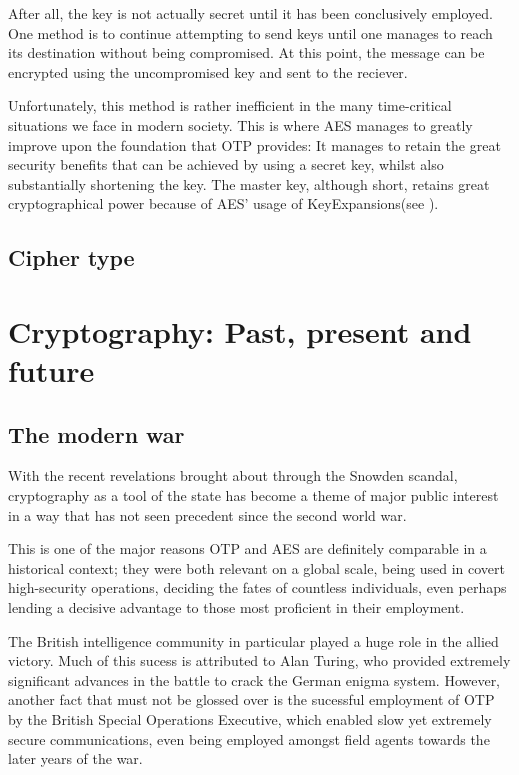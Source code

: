 \documentclass[12pt]{report}
\theoremstyle{definition}
\theoremstyle{remark}
\begin{document}
After all, the key is not actually secret until it has been conclusively employed. One method is to continue attempting to send keys until one manages to reach its destination without being compromised. At this point, the message can be encrypted using the uncompromised key and sent to the reciever.

Unfortunately, this method is rather inefficient in the many time-critical situations we face in modern society. This is where AES manages to greatly improve upon the foundation that OTP provides: It manages to retain the great security benefits that can be achieved by using a secret key, whilst also substantially shortening the key. The master key, although short, retains great cryptographical power because of AES' usage of KeyExpansions(see ).

\subsection{Cipher type}

\section{Cryptography: Past, present and future}

\subsection{The modern war}
With the recent revelations brought about through the Snowden scandal, cryptography as a tool of the state has become a theme of major public interest in a way that has not seen precedent since the second world war.

This is one of the major reasons OTP and AES are definitely comparable in a historical context; they were both relevant on a global scale, being used in covert high-security operations, deciding the fates of countless individuals, even perhaps lending a decisive advantage to those most proficient in their employment.

The British intelligence community in particular played a huge role in the allied victory. Much of this sucess is attributed to Alan Turing, who provided extremely significant advances in the battle to crack the German enigma system. However, another fact that must not be glossed over is the sucessful employment of OTP by the British Special Operations Executive, which enabled slow yet extremely secure communications, even being employed amongst field agents towards the later years of the war.
\end{document}
